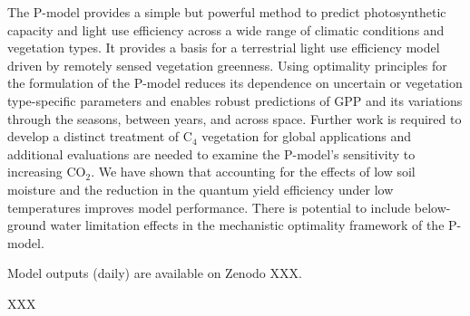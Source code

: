 \documentclass[gmd, manuscript]{copernicus}
\newcommand{\coo}{CO$_2$}
\begin{document}
\conclusions  %
The P-model provides a simple but powerful method to predict photosynthetic capacity and light use efficiency across a wide range of climatic conditions and vegetation types. It provides a basis for a terrestrial light use efficiency model driven by remotely sensed vegetation greenness. Using optimality principles for the formulation of the P-model reduces its dependence on uncertain or vegetation type-specific parameters and enables robust predictions of GPP and its variations through the seasons, between years, and across space. Further work is required to develop a distinct treatment of C$_4$ vegetation for global applications and additional evaluations are needed to examine the P-model's sensitivity to increasing \coo . We have shown that accounting for the effects of low soil moisture and the reduction in the quantum yield efficiency under low temperatures improves model performance. There is potential to include below-ground water limitation effects in the mechanistic optimality framework of the P-model. 






Model outputs (daily) are available on Zenodo XXX.


XXX 







\appendix
\end{document}
